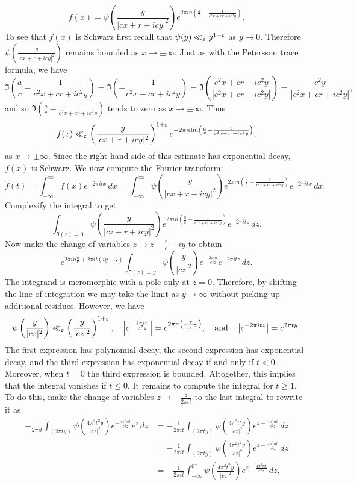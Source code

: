     \[
      f(x) = \psi\left(\frac{y}{|cx+r+icy|^{2}}\right)e^{2\pi in\left(\frac{a}{c}-\frac{1}{c^{2}x+cr+ic^{2}y}\right)}.
    \]
    To see that $f(x)$ is Schwarz first recall that $\psi(y) \ll_{\varepsilon} y^{1+\varepsilon}$ as $y \to 0$. Therefore $\psi\left(\frac{y}{|cx+r+icy|^{2}}\right)$ remains bounded as $x \to \pm \infty$. Just as with the Petersson trace formula, we have
    \[
      \Im\left(\frac{a}{c}-\frac{1}{c^{2}x+cr+ic^{2}y}\right) = \Im\left(-\frac{1}{c^{2}x+cr+ic^{2}y}\right) = \Im\left(\frac{c^{2}x+cr-ic^{2}y}{|c^{2}x+cr+ic^{2}y|}\right) = \frac{c^{2}y}{|c^{2}x+cr+ic^{2}y|},
    \]
    and so $\Im\left(\frac{a}{c}-\frac{1}{c^{2}x+cr+ic^{2}y}\right)$ tends to zero as $x \to \pm\infty$. Thus
    \[
      f(x) \ll_{\varepsilon} \left(\frac{y}{|cx+r+icy|^{2}}\right)^{1+\varepsilon}e^{-2\pi n\mathrm{Im}\left(\frac{a}{c}-\frac{1}{c^{2}x+cr+ic^{2}y}\right)},
    \]
    as $x \to \pm\infty$. Since the right-hand side of this estimate has exponential decay, $f(x)$ is Schwarz. We now compute the Fourier transform:
    \[
      \hat{f}(t) = \int_{-\infty}^{\infty}f(x)e^{-2\pi itx}\,dx = \int_{-\infty}^{\infty}\psi\left(\frac{y}{|cx+r+icy|^{2}}\right)e^{2\pi in\left(\frac{a}{c}-\frac{1}{c^{2}x+cr+ic^{2}y}\right)}e^{-2\pi itx}\,dx.
    \]
    Complexify the integral to get
    \[
      \int_{\Im(z) = 0}\psi\left(\frac{y}{|cz+r+icy|^{2}}\right)e^{2\pi in\left(\frac{a}{c}-\frac{1}{c^{2}z+cr+ic^{2}y}\right)}e^{-2\pi itz}\,dz.
    \]
    Now make the change of variables $z \to z-\frac{r}{c}-iy$ to obtain
    \[
      e^{2\pi in\frac{a}{c}+2\pi it\left(iy+\frac{r}{c}\right)}\int_{\Im(z) = y}\psi\left(\frac{y}{|cz|^{2}}\right)e^{-\frac{2\pi in}{c^{2}z}}e^{-2\pi itz}\,dz.
    \]
    The integrand is meromorphic with a pole only at $z = 0$. Therefore, by shifting the line of integration we may take the limit as $y \to \infty$ without picking up additional residues. However, we have
    \[
      \psi\left(\frac{y}{|cz|^{2}}\right) \ll_{\varepsilon} \left(\frac{y}{|cz|^{2}}\right)^{1+\varepsilon}, \quad \left|e^{-\frac{2\pi in}{c^{2}z}}\right| = e^{2\pi n\left(\frac{y}{|cz|^{2}}\right)}, \quad \text{and} \quad \left|e^{-2\pi itz}\right| = e^{2\pi ty}.
    \]
    The first expression has polynomial decay, the second expression has exponential decay, and the third expression has exponential decay if and only if $t < 0$. Moreover, when $t = 0$ the third expression is bounded. Altogether, this implies that the integral vanishes if $t \le 0$. It remains to compute the integral for $t \ge 1$. To do this, make the change of variables $z \to - \frac{z}{2\pi it}$ to the last integral to rewrite it as
    \begin{align*}
      -\frac{1}{2\pi it}\int_{(2\pi ty)}\psi\left(\frac{4\pi^{2}t^{2}y}{|cz|^{2}}\right)e^{-\frac{4\pi^{2}nt}{c^{2}z}}e^{z}\,dz &= -\frac{1}{2\pi it}\int_{(2\pi ty)}\psi\left(\frac{4\pi^{2}t^{2}y}{|cz|^{2}}\right)e^{z-\frac{4\pi^{2}nt}{c^{2}z}}\,dz \\
      &= -\frac{1}{2\pi it}\int_{(2\pi ty)}\psi\left(\frac{4\pi^{2}t^{2}y}{|cz|^{2}}\right)e^{z-\frac{4\pi^{2}nt}{c^{2}z}}\,dz \\
      &= -\frac{1}{2\pi it}\int_{-\infty}^{0^{+}}\psi\left(\frac{4\pi^{2}t^{2}y}{|cz|^{2}}\right)e^{z-\frac{4\pi^{2}nt}{c^{2}z}}\,dz,
    \end{align*}

